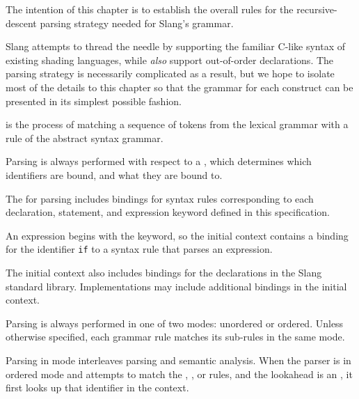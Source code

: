 
\begin{TODO}
The intention of this chapter is to establish the overall rules for the recursive-descent parsing strategy needed for Slang's grammar.

Slang attempts to thread the needle by supporting the familiar C-like syntax of existing shading languages, while \emph{also} support out-of-order declarations.
The parsing strategy is necessarily complicated as a result, but we hope to isolate most of the details to this chapter so that the grammar for each construct can be presented in its simplest possible fashion.
\end{TODO}

 is the process of matching a sequence of tokens from the lexical grammar with a rule of the abstract syntax grammar.


Parsing is always performed with respect to a , which determines which identifiers are bound, and what they are bound to.

The  for parsing includes bindings for syntax rules corresponding to each declaration, statement, and expression keyword defined in this specification.

\begin{Example}
An  expression begins with the  keyword, so the initial context contains a binding for the identifier \lstinline{if} to a syntax rule that parses an  expression. 
\end{Example}

The initial context also includes bindings for the declarations in the Slang standard library.
Implementations may include additional bindings in the initial context.




Parsing is always performed in one of two modes: unordered or ordered.
Unless otherwise specified, each grammar rule matches its sub-rules in the same mode.


Parsing in  mode interleaves parsing and semantic analysis.
When the parser is in ordered mode and attempts to match the , , or  rules, and the lookahead is an , it first looks up that identifier in the context.

